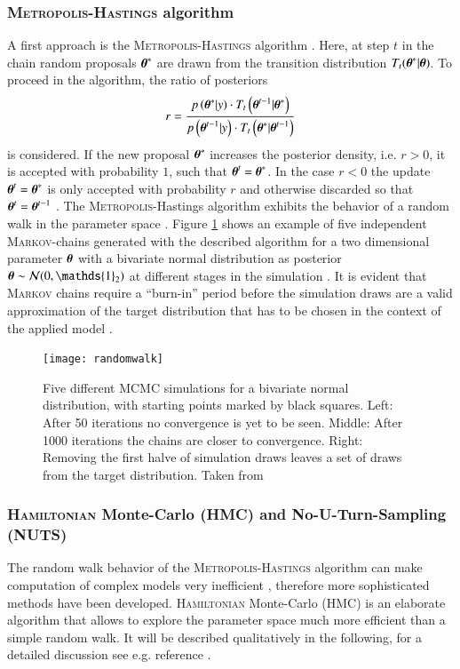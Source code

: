 \subsubsection{\textsc{Metropolis-Hastings} algorithm}
A first approach is the \textsc{Metropolis-Hastings} algorithm \cite{met,methast}. Here, at step $t$ in the chain random proposals $\boldsymbol{\theta}^*$ are drawn from the transition distribution $T_t(\boldsymbol{\theta}^*|\boldsymbol{\theta})$. To proceed in the algorithm, the ratio of posteriors
\begin{equation}
	r=\frac{p\left(\boldsymbol{\theta}^*|y\right)\cdot T_t\left(\boldsymbol{\theta}^{t-1}|\boldsymbol{\theta}^*\right)}{p\left(\boldsymbol{\theta}^{t-1}|y\right)\cdot  T_t\left(\boldsymbol{\theta}^*|\boldsymbol{\theta}^{t-1}\right)}
\end{equation} 
is considered. If the new proposal $\boldsymbol{\theta}^*$ increases the posterior density, i.e. $r>0$, it is accepted with probability $1$, such that $\boldsymbol{\theta}^t=\boldsymbol{\theta}^*$. In the case $r<0$ the update $\boldsymbol{\theta}^t=\boldsymbol{\theta}^*$ is only accepted with probability $r$ and otherwise discarded so that $\boldsymbol{\theta}^t=\boldsymbol{\theta}^{t-1}$ \cite{bayes}. The \textsc{Metropolis}-Hastings algorithm exhibits the behavior of a random walk in the parameter space \cite{bayes}. Figure \ref{fig:ex} shows an example of five independent \textsc{Markov}-chains generated with the described algorithm for a two dimensional parameter $\boldsymbol{\theta}$ with a bivariate normal distribution as posterior $\btheta\sim\mathcal{N}(0,\mathds{1}_2)$ at different stages in the simulation \cite{bayes}. It is evident that \textsc{Markov} chains require a \enquote{burn-in} period before the simulation draws are a valid approximation of the target distribution that has to be chosen in the context of the applied model \cite{bayes}.     
\begin{figure}[htbp]
\centering
\texttt{[image: randomwalk]}
\caption{Five different MCMC simulations for a bivariate normal distribution, with starting points marked by black squares. Left: After 50 iterations no convergence is yet to be seen. Middle: After 1000 iterations the chains are closer to convergence. Right: Removing the first halve of simulation draws leaves a set of draws from the target distribution. Taken from \cite{bayes}}
\label{fig:ex}
\end{figure}
\subsubsection{\textsc{Hamiltonian} Monte-Carlo (HMC) and No-U-Turn-Sampling (NUTS)}
The random walk behavior of the \textsc{Metropolis-Hastings} algorithm can make computation of complex models very inefficient \cite{bayes}, therefore more sophisticated methods have been developed. \textsc{Hamiltonian} Monte-Carlo (HMC) \cite{hmc} is an elaborate algorithm that allows to explore the parameter space much more efficient than a simple random walk. It will be described qualitatively in the following, for a detailed discussion see e.g. reference \cite{bayes}. 

